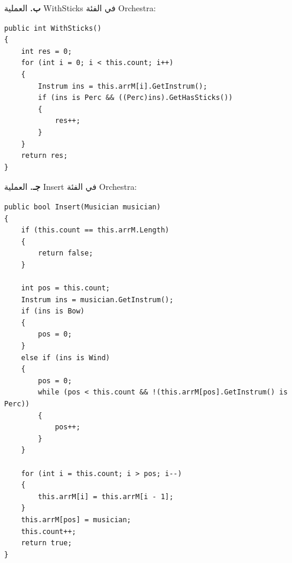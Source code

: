 \begin{boxSolution}
\textbf{ب.} العملية \textenglish{WithSticks} في الفئة \textenglish{Orchestra}:
\begin{boxCode}
\begin{english}
\begin{verbatim}
public int WithSticks()
{
    int res = 0;
    for (int i = 0; i < this.count; i++)
    {
        Instrum ins = this.arrM[i].GetInstrum();
        if (ins is Perc && ((Perc)ins).GetHasSticks())
        {
            res++;
        }
    }
    return res;
}
\end{verbatim}
\end{english}
\end{boxCode}

\textbf{جـ.} العملية \textenglish{Insert} في الفئة \textenglish{Orchestra}:
\begin{boxCode}
\begin{english}
\begin{verbatim}
public bool Insert(Musician musician)
{
    if (this.count == this.arrM.Length)
    {
        return false;
    }

    int pos = this.count;
    Instrum ins = musician.GetInstrum();
    if (ins is Bow)
    {
        pos = 0;
    }
    else if (ins is Wind)
    {
        pos = 0;
        while (pos < this.count && !(this.arrM[pos].GetInstrum() is Perc))
        {
            pos++;
        }
    }

    for (int i = this.count; i > pos; i--)
    {
        this.arrM[i] = this.arrM[i - 1];
    }
    this.arrM[pos] = musician;
    this.count++;
    return true;
}
\end{verbatim}
\end{english}
\end{boxCode}
\end{boxSolution}
\fi
\filbreak
